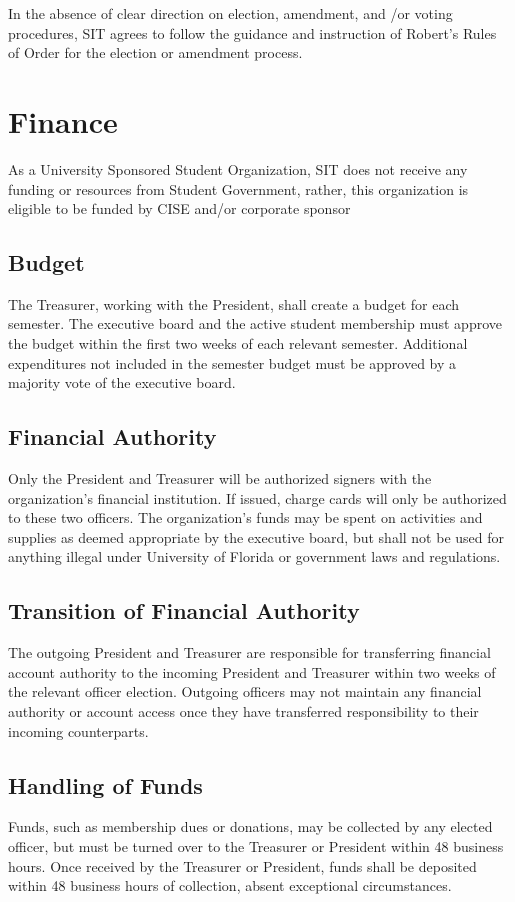 \documentclass{article}
\def\clubname{SIT }
\begin{document}
In the absence of clear direction on election, amendment, and /or voting procedures, \clubname agrees to follow the guidance and instruction of Robert's Rules of Order for the election or amendment process.


\section{Finance}
As a University Sponsored Student Organization, \clubname does not receive any funding or resources from Student Government, rather, this organization is eligible to be funded by CISE and/or corporate sponsor

\subsection{Budget}
The Treasurer, working with the President, shall create a budget for each semester. The executive board and the active student membership must approve the budget within the first two weeks of each relevant semester. Additional expenditures not included in the semester budget must be approved by a majority vote of the executive board.

\subsection{Financial Authority}
Only the President and Treasurer will be authorized signers with the organization’s financial institution. If issued, charge cards will only be authorized to these two officers. The organization’s funds may be spent on activities and supplies as deemed appropriate by the executive board, but shall not be used for anything illegal under University of Florida or government laws and regulations.

\subsection{Transition of Financial Authority}
The outgoing President and Treasurer are responsible for transferring financial account authority to the incoming President and Treasurer within two weeks of the relevant officer election. Outgoing officers may not maintain any financial authority or account access once they have transferred responsibility to their incoming counterparts.

\subsection{Handling of Funds}
Funds, such as membership dues or donations, may be collected by any elected officer, but must be turned over to the Treasurer or President within 48 business hours. Once received by the Treasurer or President, funds shall be deposited within 48 business hours of collection, absent exceptional circumstances.
\end{document}
